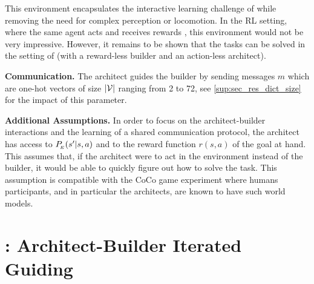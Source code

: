 This environment encapsulates the interactive learning challenge of \abp while removing the need for complex perception or locomotion. 
In the RL setting, where the same agent acts and receives rewards%
, this environment would not be very impressive. However, it remains to be shown that the tasks can be solved in the %
setting of \abp (with a reward-less builder and an action-less architect).

\textbf{Communication. } The architect guides the builder by sending messages $m$ which are one-hot vectors of size $|{\mathcal{V}}|$ ranging from 2 to 72, see \ap\ref{sup:sec_res_dict_size} for the impact of this parameter.

\textbf{Additional Assumptions. }  In order to focus on the architect-builder interactions and the learning of a shared communication protocol, the architect has access to $P_{\!_E}(s'|s,a)$ and to the reward function $r(s,a)$ of the goal at hand. This assumes that, if the architect were to act in the environment instead of the builder, it would be able to quickly figure out how to solve the task. This assumption is compatible with the CoCo game experiment \cite{vollmer2014studying} where humans participants, and in particular the architects, are known to have such world models.


\section{\abig: Architect-Builder Iterated Guiding}
